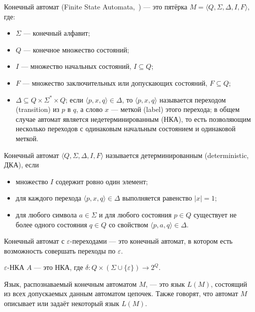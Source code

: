 \begin{mydef}
Конечный автомат (Finite State Automata,~\cite{FSA}) --- это пятёрка $M = \langle Q,\Sigma,\Delta,I,F \rangle$, где:
\begin{itemize}
    \item $\Sigma$ --- конечный алфавит;
    \item $Q$ --- конечное множество состояний;
    \item $I$ --- множество начальных состояний, $I \subseteq Q$;
    \item $F$ --- множество заключительных или допускающих состояний, $F \subseteq Q$;
    \item $\Delta \subseteq Q \times \Sigma ^ * \times Q$; если $\langle p, x, q \rangle \in \Delta$, то $\langle p, x, q \rangle$ называется переходом (transition) из $p$ в $q$, а слово $x$ --- меткой (label) этого перехода; в общем случае автомат является недетерминированным (НКА), то есть позволяющим несколько переходов с одинаковым начальным состоянием и одинаковой меткой.
\end{itemize}
\end{mydef}

\begin{mydef}
Конечный автомат $\langle Q , \Sigma , \Delta , I , F \rangle$ называется детерминированным (deterministic, ДКА), если 
\begin{itemize}
    \item множество $I$ содержит ровно один элемент;
    \item для каждого перехода $\langle p , x , q \rangle \in \Delta$ выполняется равенство $|x| = 1$;
    \item для любого символа $a \in \Sigma$ и для любого состояния $p \in Q$ существует не более одного состояния $q \in Q$ со свойством $\langle p , a , q \rangle \in \Delta$.
\end{itemize}
\end{mydef}

\begin{mydef}
Конечный автомат с $\varepsilon$-переходами --- это конечный автомат, в котором есть возможность совершать переходы по $\varepsilon$.
\end{mydef}

\begin{mydef}
$\varepsilon$-НКА $A$ --- это НКА, где  $\delta : Q\times (\Sigma\cup\{\varepsilon\}) \to 2^Q$.
\end{mydef}

\begin{mydef}
 Язык, распознаваемый конечным автоматом $M$, --- это язык $L(M)$, состоящий из всех допускаемых данным автоматом цепочек. Также говорят, что автомат $M$ описывает или задаёт некоторый язык $L(M)$.
\end{mydef}

